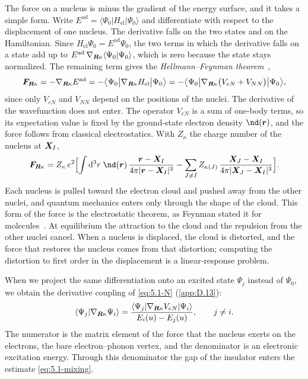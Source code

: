 The force on a nucleus is minus the gradient of the energy surface, and it takes a simple form. Write $E^{\mathrm{ad}} = \langle\Psi_0|H_{\mathrm{el}}|\Psi_0\rangle$ and differentiate with respect to the displacement of one nucleus. The derivative falls on the two states and on the Hamiltonian. Since $H_{\mathrm{el}}\Psi_0 = E^{\mathrm{ad}}\Psi_0$, the two terms in which the derivative falls on a state add up to $E^{\mathrm{ad}}\,\nabla_{\bm{R}\kappa}\langle\Psi_0|\Psi_0\rangle$, which is zero because the state stays normalized. The remaining term gives the \emph{Hellmann--Feynman theorem}~\cite{hellmann1937einfuhrung,feynman1939forces},
\begin{equation}
  \bm{F}_{\bm{R}\kappa} = -\nabla_{\bm{R}\kappa}E^{\mathrm{ad}} = -\bigl\langle\Psi_0\big|\nabla_{\bm{R}\kappa}H_{\mathrm{el}}\big|\Psi_0\bigr\rangle
  = -\bigl\langle\Psi_0\big|\nabla_{\bm{R}\kappa}\bigl(V_{eN} + V_{NN}\bigr)\big|\Psi_0\bigr\rangle ,
  \label{eq:5.1-HF}
\end{equation}
since only $V_{eN}$ and $V_{NN}$ depend on the positions of the nuclei. The derivative of the wavefunction does not enter. The operator $V_{eN}$ is a sum of one-body terms, so its expectation value is fixed by the ground-state electron density $\nd(\vect{r})$, and the force follows from classical electrostatics. With $Z_\kappa$ the charge number of the nucleus at $\bm{X}_I$,
\begin{equation*}
  \vect{F}_{\vect{R}\kappa} = Z_\kappa\,e^2\Bigl[\int\dd^3r\;\nd(\vect{r})\,\frac{\vect{r} - \vect{X}_I}{4\pi|\vect{r} - \vect{X}_I|^3} - \sum_{J\ne I}Z_{\kappa(J)}\,\frac{\vect{X}_J - \vect{X}_I}{4\pi|\vect{X}_J - \vect{X}_I|^3}\Bigr] .
\end{equation*}
Each nucleus is pulled toward the electron cloud and pushed away from the other nuclei, and quantum mechanics enters only through the shape of the cloud. This form of the force is the electrostatic theorem, as Feynman stated it for molecules~\cite{feynman1939forces}. At equilibrium the attraction to the cloud and the repulsion from the other nuclei cancel. When a nucleus is displaced, the cloud is distorted, and the force that restores the nucleus comes from that distortion; computing the distortion to first order in the displacement is a linear-response problem.

When we project the same differentiation onto an excited state $\Psi_j$ instead of $\Psi_0$, we obtain the derivative coupling of \cref{eq:5.1-N} (\cref{app:D.13}):
\begin{equation}
  \langle\Psi_j|\nabla_{\bm{R}\kappa}\Psi_i\rangle = \frac{\langle\Psi_j|\nabla_{\bm{R}\kappa}V_{eN}|\Psi_i\rangle}{E_i(u) - E_j(u)} , \qquad j \ne i .
  \label{eq:5.1-dcoup}
\end{equation}
The numerator is the matrix element of the force that the nucleus exerts on the electrons, the bare electron--phonon vertex, and the denominator is an electronic excitation energy. Through this denominator the gap of the insulator enters the estimate \cref{eq:5.1-mixing}.

